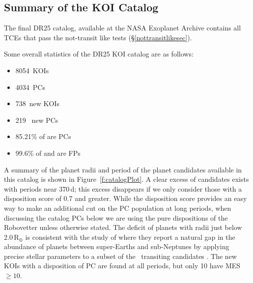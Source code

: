 \def \nkois {8054}
\def \ncand {4034}
\def \newkois {738}
\def \newcand {219}
\def \completeness {85.21}
\def \reliability {97.14}
\def \effectiveness {99.6}

\subsection{Summary of the KOI Catalog}

The final DR25 catalog, available at the NASA Exoplanet Archive contains all TCEs that pass the not-transit like tests (\S\ref{nottransitlikesec}). 


Some overall statistics of the DR25 KOI catalog are as follows:
\begin{itemize}
    \item \nkois{}~KOIs
    \item \ncand{}~PCs
    \item \newkois{}~new KOIs
    \item \newcand{}~ new PCs
    \item \completeness{}\% of  are PCs
    \item \effectiveness{}\% of  and  are FPs
\end{itemize}

A summary of the planet radii and period of the planet candidates available in this catalog is shown in Figure~\ref{f:catalogPlot}. A clear excess of candidates exists with periods near 370\,d;  this excess disappears if we only consider those with a disposition score of 0.7 and greater. While the disposition score provides an easy way to make an additional cut on the PC population at long periods, when discussing the catalog PCs below we are using the pure dispositions of the Robovetter unless otherwise stated. The deficit of planets with radii just below 2.0\,R$_{\oplus}$ is consistent with the study of \citet{Fulton2017} where they report a natural gap in the abundance of planets between super-Earths and sub-Neptunes by applying precise stellar parameters to a subset of the \kepler\ transiting candidates \citep{CKS1,CKS2}. The new KOIs with a disposition of PC are found at all periods, but only 10 have MES$\geq 10 $. 

